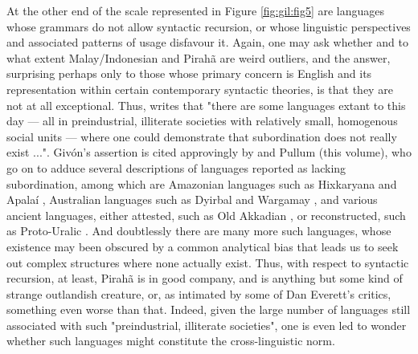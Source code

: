 \documentclass[output=paper,colorlinks,citecolor=brown
]{langscibook}
\begin{document}
At the other end of the scale represented in Figure \ref{fig:gil:fig5} are languages whose grammars do not allow syntactic recursion, or whose linguistic perspectives and associated patterns of usage disfavour it.  Again, one may ask whether and to what extent Malay/Indonesian and Pirahã are weird outliers, and the answer, surprising perhaps only to those whose primary concern is English and its representation within certain contemporary syntactic theories, is that they are not at all exceptional.  Thus, \citet[298]{givon1979understanding} writes that "there are some languages extant to this day — all in preindustrial, illiterate societies with relatively small, homogenous social units — where one could demonstrate that subordination does not really exist ...".  Givón's assertion is cited approvingly by \citet{pullum2010recursion} and Pullum (this volume), who go on to adduce several descriptions of languages reported as lacking subordination, among which are Amazonian languages such as Hixkaryana
\citep{derbyshire1979hixkaryana} and Apalaí \citep{koehn1986apalai}, Australian languages such as Dyirbal \citep{dixon1972dyirbal} and Wargamay \citep{dixon1981wargamay}, and various ancient languages, either attested, such as Old Akkadian \citep{deutscher2000syntactic}, or reconstructed, such as Proto-Uralic \citep{collinder1960comparative}.  And doubtlessly there are many more such languages, whose existence may been obscured by a common analytical bias that leads us to seek out complex structures where none actually exist.  Thus, with respect to syntactic recursion, at least, Pirahã is in good company, and is anything but some kind of strange outlandish creature, or, as intimated by some of Dan Everett's critics, something even worse than that.  Indeed, given the large number of languages still associated with such "preindustrial, illiterate societies", one is even led to wonder whether such languages might constitute the cross-linguistic norm.
\end{document}
